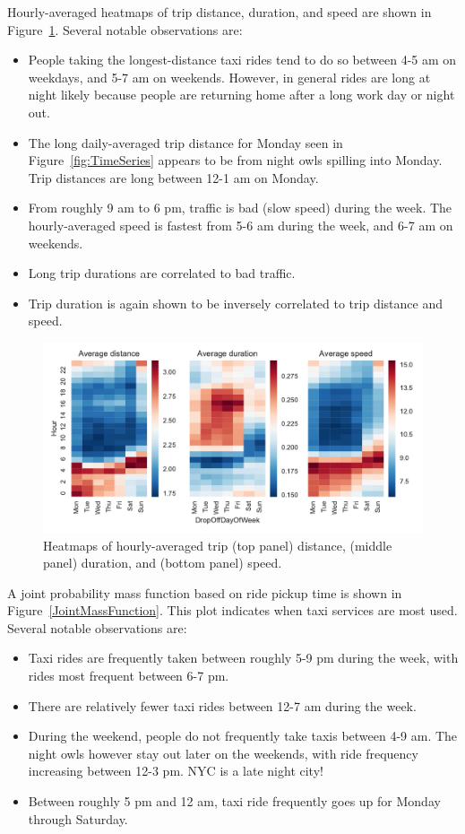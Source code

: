 \documentclass[twocolumn,10pt]{article}
\begin{document}
Hourly-averaged heatmaps of trip distance, duration, and speed are shown in Figure~\ref{fig:heatMapDuration}. Several notable observations are:
\begin{itemize}
\item People taking the longest-distance taxi rides tend to do so between 4-5 am on weekdays, and 5-7 am on weekends. However, in general rides are long at night likely because people are returning home after a long work day or night out.
\item The long daily-averaged trip distance for Monday seen in Figure~\ref{fig:TimeSeries} appears to be from night owls spilling into Monday. Trip distances are long between 12-1 am on Monday.
\item From roughly 9 am to 6 pm, traffic is bad (slow speed) during the week. The hourly-averaged speed is fastest from 5-6 am during the week, and 6-7 am on weekends. 
\item Long trip durations are correlated to bad traffic. 
\item Trip duration is again shown to be inversely correlated to trip distance and speed.
\end{itemize}

\begin{figure}
\centering
\includegraphics[width=140mm]{heatMapDuration}
\caption{Heatmaps of hourly-averaged trip (top panel) distance, (middle panel) duration, and (bottom panel) speed.}
\label{fig:heatMapDuration}
\end{figure}

A joint probability mass function based on ride pickup time is shown in Figure~\ref{JointMassFunction}. This plot indicates when taxi services are most used. Several notable observations are:

\begin{itemize}
\item Taxi rides are frequently taken between roughly 5-9 pm during the week, with rides most frequent between 6-7 pm. 
\item There are relatively fewer taxi rides between 12-7 am during the week.
\item During the weekend, people do not frequently take taxis between 4-9 am. The night owls however stay out later on the weekends, with ride frequency increasing between 12-3 pm. NYC is a late night city!   
\item Between roughly 5 pm and 12 am, taxi ride frequently goes up for Monday through Saturday.
\end{itemize}
\end{document}
